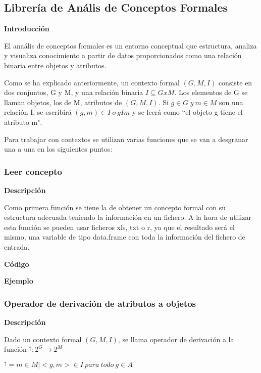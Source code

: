 \subsection{Librer\'ia de An\'alis de Conceptos Formales}

\textbf{Introducci\'on}

El ana\'alis de conceptos formales es un entorno conceptual que estructura, analiza y visualiza conocimiento a partir de datos proporcionados 
como una relaci\'on binaria entre objetos y atributos.

Como se ha explicado anteriormente, un contexto formal \( (G, M, I) \) consiste en dos conjuntos, G y M, y una relaci\'on binaria \( I \subseteq G x M \). Los elementos 
de G se llaman objetos, los de M, atributos de \( (G, M, I) \). Si \(g \in G ~ y ~ m \in M \) son una relaci\'on I, se escribir\'a 
\( (g,m) \in I ~ o ~ g I m \) y se leer\'a como ``el objeto g tiene el atributo m".

Para trabajar con contextos se utilizan varias funciones que se van a desgranar una a una en los siguientes puntos:

    \subsubsection{Leer concepto}

        \textbf{Descripci\'on}

        Como primera funci\'on se tiene la de obtener un concepto formal con su estructura adecuada teniendo la informaci\'on en un fichero. A la 
        hora de utilizar esta funci\'on se pueden usar ficheros xls, txt o r, ya que el resultado ser\'a el mismo, una variable de tipo data.frame 
        con toda la informaci\'on del fichero de entrada.

        \textbf{C\'odigo}


        \textbf{Ejemplo}



    \subsubsection{Operador de derivaci\'on de atributos a objetos}

        \textbf{Descripci\'on}

        Dado un contexto formal \( (G, M, I) \), se llama operador de derivaci\'on a la funci\'on \( ^\uparrow : 2^G \rightarrow 2^M \)

        \( ^\uparrow = { m \in M | <g,m> \in I ~ para ~ todo ~ g \in A } \)

